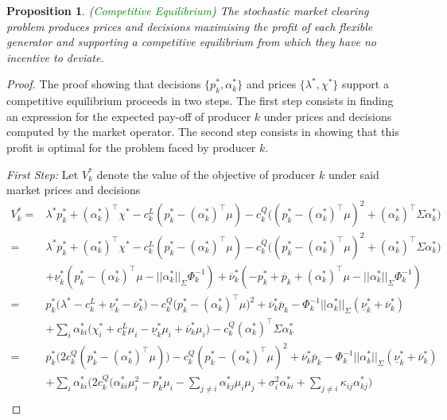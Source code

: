 \documentclass{article}
\newtheorem{proposition}{Proposition}
\begin{document}
\begin{proposition}
(\textcolor{green}{Competitive Equilibrium}) The stochastic market clearing problem produces prices and decisions maximising the profit of each flexible generator and supporting a competitive equilibrium from which they have no incentive to deviate.
\end{proposition}
\begin{proof}
The proof showing that decisions $\{p_k^*, \alpha_k^*\}$ and prices $\{\lambda^*, \chi^*\}$ support a competitive equilibrium proceeds in two steps. The first step consists in finding an expression for the expected pay-off of producer $k$ under prices and decisions computed by the market operator. The second step consists in showing that this profit is optimal for the problem faced by producer $k$.

\textit{First Step:} Let $V_k^*$ denote the value of the objective of producer $k$ under said market prices and decisions
\begin{align*}
    V_k^* =& \lambda^*p_k^* + (\alpha_k^*)^\top\chi^* - c_k^L(p_k^* - (\alpha_k^*)^\top \mu) - c_k^Q\big((p_k^* - (\alpha_k^*)^\top \mu)^2 + (\alpha_k^*)^\top\Sigma \alpha_k^*\big) \\
    =& \lambda^*p_k^* + (\alpha_k^*)^\top\chi^* - c_k^L(p_k^* - (\alpha_k^*)^\top \mu) - c_k^Q\big((p_k^* - (\alpha_k^*)^\top \mu)^2 + (\alpha_k^*)^\top\Sigma \alpha_k^*\big)\\
   &+ \underline{\nu}_k^*(p_k^* - (\alpha_k^*)^\top \mu - ||\alpha_k^*||_{\Sigma} \Phi_k^{-1}) + \overline{\nu}_k^* (-p_k^* + \overline{p}_k + (\alpha_k^*)^\top \mu - ||\alpha_k^*||_{\Sigma} \Phi_k^{-1})\\
=& p_k^*\big(\lambda^* - c_k^L + \underline{\nu}_k^* - \overline{\nu}_k^*\big) - c_k^Q\big(p_k^* - (\alpha_k^*)^\top \mu\big)^2 + \overline{\nu}_k^* \overline{p}_k - \Phi_k^{-1}||\alpha_k^*||_{\Sigma} (\underline{\nu}_k^* + \overline{\nu}_k^*)\\
    &+ \sum_i \alpha_{ki}^*\big(\chi_i^* + c_k^L \mu_i - \underline{\nu}_k^* \mu_i + \overline{\nu}_k^* \mu_i\big) - c_k^Q (\alpha_k^*)^\top\Sigma \alpha_k^* \\
    =& p_k^*\big(2c_k^Q(p_k^* - (\alpha_k^*)^\top \mu)\big) - c_k^Q(p_k^* - (\alpha_k^*)^\top \mu)^2 + \overline{\nu}_k^* \overline{p}_k - \Phi_k^{-1}||\alpha_k^*||_{\Sigma} (\underline{\nu}_k^* + \overline{\nu}_k^*)\\ 
    &+ \sum_i \alpha_{ki}^*\Big(2c_k^Q\big(\alpha_{ki}^*\mu_i^2 - p_k^* \mu_i - \sum_{j \ne i} \alpha_{kj}^* \mu_i \mu_j + \sigma_i^2 \alpha_{ki}^* + \sum_{j \ne i} \kappa_{ij} \alpha_{kj}^*\big) \\

\end{align*}
\end{proof}
\end{document}
